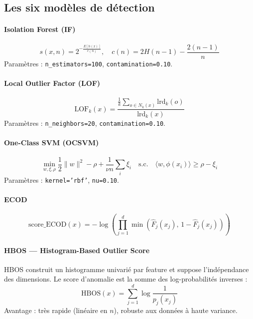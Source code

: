 \documentclass[12pt,a4paper]{report}
\begin{document}
\subsection{Les six modèles de détection}

\paragraph{Isolation Forest (IF) \cite{liu2008}}
\begin{equation}
  s(x, n) = 2^{-\frac{E[h(x)]}{c(n)}}, \quad c(n) = 2H(n-1) - \frac{2(n-1)}{n}
\end{equation}
Paramètres : \texttt{n\_estimators=100}, \texttt{contamination=0.10}.

\paragraph{Local Outlier Factor (LOF) \cite{breunig2000}}
\begin{equation}
  \text{LOF}_k(x) = \frac{\frac{1}{k}\sum_{o \in N_k(x)} \text{lrd}_k(o)}{\text{lrd}_k(x)}
\end{equation}
Paramètres : \texttt{n\_neighbors=20}, \texttt{contamination=0.10}.

\paragraph{One-Class SVM (OCSVM) \cite{scholkopf2001}}
\begin{equation}
  \min_{w,\xi,\rho} \frac{1}{2}\|w\|^2 - \rho + \frac{1}{\nu n}\sum_i \xi_i
  \quad \text{s.c.} \quad \langle w, \phi(x_i)\rangle \geq \rho - \xi_i
\end{equation}
Paramètres : \texttt{kernel='rbf'}, \texttt{nu=0.10}.

\paragraph{ECOD \cite{li2021}}
\begin{equation}
  \text{score\_ECOD}(x) = -\log\!\left(\prod_{j=1}^{d} \min\!\left(\hat{F}_j(x_j),\, 1-\hat{F}_j(x_j)\right)\right)
\end{equation}

\paragraph{HBOS — Histogram-Based Outlier Score \cite{goldstein2012}}
HBOS construit un histogramme univarié par feature et suppose l'indépendance des dimensions.
Le score d'anomalie est la somme des log-probabilités inverses :
\begin{equation}
  \text{HBOS}(x) = \sum_{j=1}^{d} \log\!\frac{1}{p_j(x_j)}
\end{equation}
Avantage : très rapide (linéaire en $n$), robuste aux données à haute variance.
\end{document}
